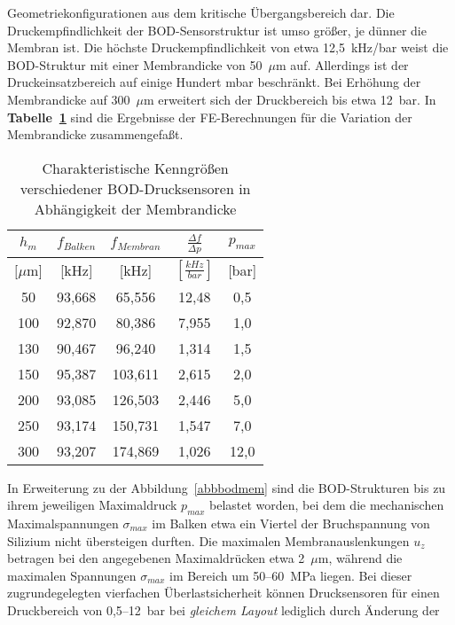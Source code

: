 Geometriekonfigurationen aus dem kritische Übergangsbereich dar. Die
Druckempfindlichkeit der BOD-Sensorstruktur ist umso größer, je dünner die
Membran ist. Die höchste Druckempfindlichkeit von etwa 12,5~kHz/bar weist
die BOD-Struktur mit einer Membrandicke von 50~$\mu$m auf. Allerdings ist
der Druckeinsatzbereich auf einige Hundert mbar beschränkt. Bei Erhöhung
der Membrandicke auf 300~$\mu$m erweitert sich der Druckbereich bis etwa
12~bar. In {\bf Tabelle~\ref{tabbodopti}} sind die Ergebnisse der
FE-Berechnungen für die Variation der Membrandicke zusammengefaßt.
\begin{table}[htb]
\caption{\label{tabbodopti}
 Charakteristische Kenngrößen verschiedener BOD-Drucksensoren in Abhängigkeit
 der Membrandicke}
\begin{center}
\begin{tabular}{|c||c|c||c|c|}
\hline
 $h_{m}$ & $f_{Balken}$ & $f_{Membran}$
 & $\frac{\Delta f}{\Delta p}$ & $p_{max}$ \\
\hline
 $[\mu$m] & [kHz] & [kHz] & $[\frac{kHz}{bar}]$ & [bar] \\
\hline \hline
  50 & 93,668 & 65,556 & 12,48  &  0,5 \\
 100 & 92,870 & 80,386 & 7,955  &  1,0 \\
 130 & 90,467 & 96,240 & 1,314  &  1,5 \\
\hline
 150 & 95,387 & 103,611 & 2,615 &  2,0 \\
\hline
 200 & 93,085 & 126,503 & 2,446 &  5,0 \\
 250 & 93,174 & 150,731 & 1,547 &  7,0 \\
 300 & 93,207 & 174,869 & 1,026 & 12,0 \\
\hline
\end{tabular}
\end{center}
\end{table}
In Erweiterung zu der Abbildung~\ref{abbbodmem} sind die
BOD-Strukturen bis zu ihrem jeweiligen Maximaldruck $p_{max}$ belastet
worden, bei dem die mechanischen Maximalspannungen $\sigma_{max}$ im Balken
etwa ein Viertel der Bruchspannung von Silizium nicht übersteigen durften.
Die maximalen Membranauslenkungen $u_{z}$ betragen bei den angegebenen
Maximaldrücken etwa 2~$\mu$m, während die maximalen Spannungen
$\sigma_{max}$ im Bereich um 50--60~MPa liegen. Bei dieser zugrundegelegten
vierfachen Überlastsicherheit können Drucksensoren für einen Druckbereich
von 0,5--12~bar bei {\em gleichem Layout} lediglich durch Änderung der

